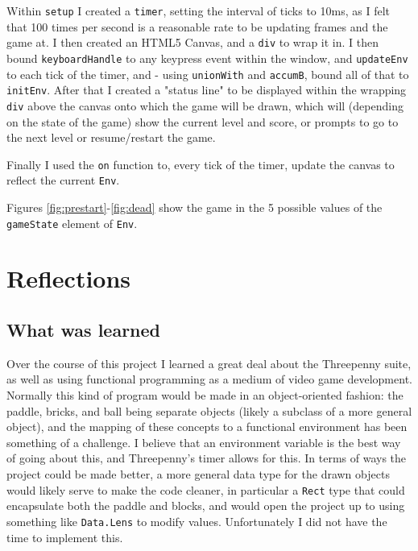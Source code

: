 \documentclass[12pt]{article}
\begin{document}
\par

Within \verb|setup| I created a \verb|timer|, setting the interval of ticks to 10ms, as I felt that 100 times per second is a reasonable rate to be updating frames and the game at.
I then created an HTML5 Canvas, and a \verb|div| to wrap it in.
I then bound \verb|keyboardHandle| to any keypress event within the window, and \verb|updateEnv| to each tick of the timer, and - using \verb|unionWith| and \verb|accumB|, bound all of that to \verb|initEnv|.
After that I created a "status line" to be displayed within the wrapping \verb|div| above the canvas onto which the game will be drawn, which will (depending on the state of the game) show the current level and score, or prompts to go to the next level or resume/restart the game.

\par

Finally I used the \verb|on| function to, every tick of the timer, update the canvas to reflect the current \verb|Env|.

\par

Figures \ref{fig:prestart}-\ref{fig:dead} show the game in the 5 possible values of the \verb|gameState| element of \verb|Env|.

\section{Reflections}

\subsection{What was learned}

Over the course of this project I learned a great deal about the Threepenny suite, as well as using functional programming as a medium of video game development.
Normally this kind of program would be made in an object-oriented fashion: the paddle, bricks, and ball being separate objects (likely a subclass of a more general object), and the mapping of these concepts to a functional environment has been something of a challenge.
I believe that an environment variable is the best way of going about this, and Threepenny's timer allows for this.
In terms of ways the project could be made better, a more general data type for the drawn objects would likely serve to make the code cleaner, in particular a \verb|Rect| type that could encapsulate both the paddle and blocks, and would open the project up to using something like \verb|Data.Lens| to modify values.
Unfortunately I did not have the time to implement this.
\end{document}
